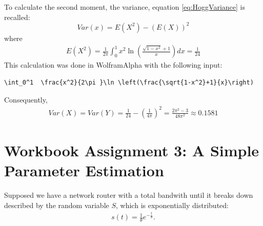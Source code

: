 To calculate the second moment, the variance, equation \eqref{eq:HoggVariance} is recalled:
\[
Var(x) = E(X^2)-(E(X))^2
\]
where
\begin{equation}
\begin{split}
E(X^2) =  \frac{1}{2\pi}\int_0^1  x^2\ln \left(\frac{\sqrt{1-x^2}+1}{x}\right) dx = \frac{1}{24}
\end{split}
\label{eq:E(X^2)}
\end{equation}
This calculation was done in WolframAlpha \cite{wolfalph} with the following input:
\begin{lstlisting}
\int_0^1  \frac{x^2}{2\pi }\ln \left(\frac{\sqrt{1-x^2}+1}{x}\right)
\end{lstlisting}
Consequently, 
\begin{equation}
\begin{split}
Var(X) = Var(Y) = \frac{1}{24}- \left(\frac{1}{4\pi}\right)^2 = \frac{2\pi ^2-3}{48\pi ^2} \approx 0.1581
\end{split}
\label{eq:VarXcalculated}
\end{equation}



\chapter{Workbook Assignment 3: A Simple Parameter Estimation}	

Supposed we have a network router with a total bandwith until it breaks down described by the random variable $S$, which is exponentially distributed:
\begin{equation}
\begin{split}
s(t) =  \frac{1}{\theta} e^{-\frac{t}{\theta}}.
\end{split}
\label{eq:exphardwarefailure}
\end{equation}

